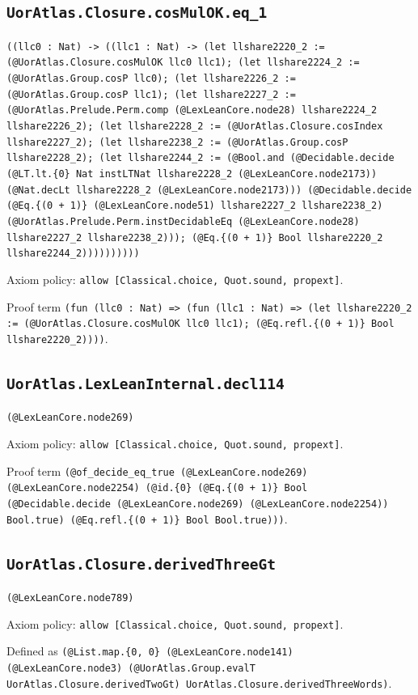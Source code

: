 \documentclass[11pt]{article}
\begin{document}
\subsection*{\texttt{UorAtlas.Closure.cosMulOK.eq\_1}}
\noindent\texttt{((llc0 : Nat) -> ((llc1 : Nat) -> (let llshare2220\_2 := (@UorAtlas.Closure.cosMulOK llc0 llc1); (let llshare2224\_2 := (@UorAtlas.Group.cosP llc0); (let llshare2226\_2 := (@UorAtlas.Group.cosP llc1); (let llshare2227\_2 := (@UorAtlas.Prelude.Perm.comp (@LexLeanCore.node28) llshare2224\_2 llshare2226\_2); (let llshare2228\_2 := (@UorAtlas.Closure.cosIndex llshare2227\_2); (let llshare2238\_2 := (@UorAtlas.Group.cosP llshare2228\_2); (let llshare2244\_2 := (@Bool.and (@Decidable.decide (@LT.lt.\{0\} Nat instLTNat llshare2228\_2 (@LexLeanCore.node2173)) (@Nat.decLt llshare2228\_2 (@LexLeanCore.node2173))) (@Decidable.decide (@Eq.\{(0 + 1)\} (@LexLeanCore.node51) llshare2227\_2 llshare2238\_2) (@UorAtlas.Prelude.Perm.instDecidableEq (@LexLeanCore.node28) llshare2227\_2 llshare2238\_2))); (@Eq.\{(0 + 1)\} Bool llshare2220\_2 llshare2244\_2))))))))))}\par
\noindent Axiom policy: \texttt{allow [Classical.choice, Quot.sound, propext]}.\par
\noindent Proof term \texttt{(fun (llc0 : Nat) => (fun (llc1 : Nat) => (let llshare2220\_2 := (@UorAtlas.Closure.cosMulOK llc0 llc1); (@Eq.refl.\{(0 + 1)\} Bool llshare2220\_2))))}.\par
\subsection*{\texttt{UorAtlas.LexLeanInternal.decl114}}
\noindent\texttt{(@LexLeanCore.node269)}\par
\noindent Axiom policy: \texttt{allow [Classical.choice, Quot.sound, propext]}.\par
\noindent Proof term \texttt{(@of\_decide\_eq\_true (@LexLeanCore.node269) (@LexLeanCore.node2254) (@id.\{0\} (@Eq.\{(0 + 1)\} Bool (@Decidable.decide (@LexLeanCore.node269) (@LexLeanCore.node2254)) Bool.true) (@Eq.refl.\{(0 + 1)\} Bool Bool.true)))}.\par
\subsection*{\texttt{UorAtlas.Closure.derivedThreeGt}}
\noindent\texttt{(@LexLeanCore.node789)}\par
\noindent Axiom policy: \texttt{allow [Classical.choice, Quot.sound, propext]}.\par
\noindent Defined as \texttt{(@List.map.\{0, 0\} (@LexLeanCore.node141) (@LexLeanCore.node3) (@UorAtlas.Group.evalT UorAtlas.Closure.derivedTwoGt) UorAtlas.Closure.derivedThreeWords)}.\par
\end{document}
